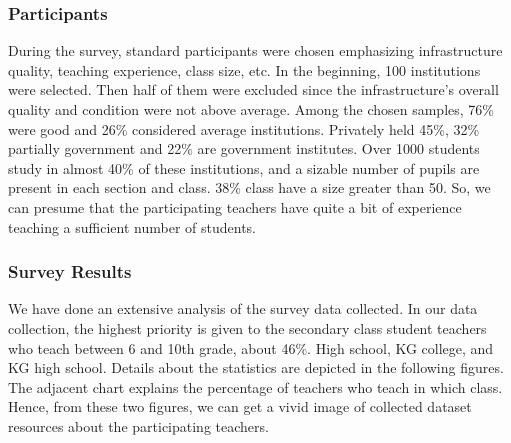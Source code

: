 \documentclass[sn-mathphys,Numbered]{sn-jnl}%
\theoremstyle{thmstyleone}%
\theoremstyle{thmstyletwo}%
\theoremstyle{thmstylethree}%
\begin{document}
\subsubsection{Participants} During the survey, standard participants were chosen emphasizing infrastructure quality, teaching experience, class size, etc. In the beginning, 100 institutions were selected. Then half of them were excluded since the infrastructure's overall quality and condition were not above average. Among the chosen samples, 76\% were good and 26\% considered average institutions. Privately held 45\%, 32\% partially government and 22\% are government institutes. Over 1000 students study in almost 40\% of these institutions, and a sizable number of pupils are present in each section and class. 38\% class have a size greater than 50. So, we can presume that the participating teachers have quite a bit of experience teaching a sufficient number of students.\\

\subsubsection{Survey Results} We have done an extensive analysis of the survey data collected. In our data collection, the highest priority is given to the secondary class student teachers who teach between 6 and 10th grade, about 46\%. High school, KG college, and KG high school. Details about the statistics are depicted in the following figures. The adjacent chart explains the percentage of teachers who teach in which class. Hence, from these two figures, we can get a vivid image of collected dataset resources about the participating teachers.\\
\end{document}
